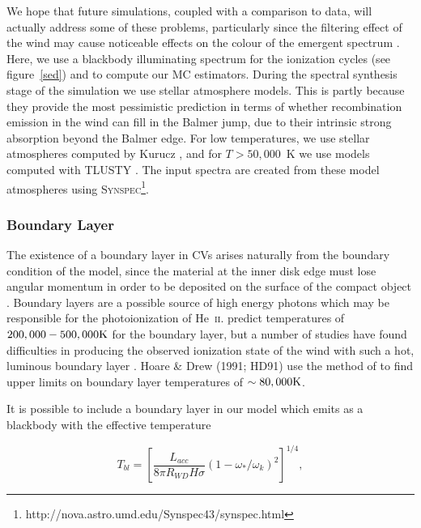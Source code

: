 \documentclass[preprint, a4paper, 11pt]{aastex}
\begin{document}
We hope that future simulations, coupled with a comparison to data, will 
actually address some of these problems, particularly since
the filtering effect of the wind may cause noticeable effects
on the colour of the emergent spectrum \citep{hassall}. 
Here, we use a blackbody illuminating spectrum
for the ionization cycles (see figure~\ref{sed}) and to compute our MC estimators.
During the spectral synthesis stage of the simulation we use stellar atmosphere models.
This is partly because they provide the most pessimistic prediction in terms of whether recombination emission in the 
wind can fill in the Balmer jump, due to their intrinsic strong absorption beyond the Balmer edge.
For low temperatures, we use stellar atmospheres computed 
by Kurucz \citep{kurucz1991}, and for $T>50,000$~K we use models computed with 
\textsc{TLUSTY} \citep{tlusty}. The input spectra are created from these model
atmospheres using \textsc{Synspec}\footnote{http://nova.astro.umd.edu/Synspec43/synspec.html}.


\subsubsection{Boundary Layer}
The existence of a boundary layer in CVs arises naturally from the boundary condition
of the \cite{shakurasunyaev1973} model, since the material at the inner disk
edge must lose angular momentum in order to be deposited on
the surface of the compact object \cite[see e.g.][]{lyndenbell1974}.
Boundary layers are a possible source of
high energy photons which may be responsible for the photoionization of 
He~\textsc{ii}. 
\cite{pringlesavonije1979} predict temperatures of 
$200,000-500,000{\rm K}$ for the boundary layer,
but a number of studies have found difficulties
in producing the observed ionization state of the wind
with such a hot, luminous boundary layer 
\citep[see e.g.][]{maucheraymond1987, drewverbunt1985}.
Hoare \& Drew (1991; HD91) \nocite{hoare1991}
use the method of \cite{zanstra1929} to find upper limits on 
boundary layer temperatures of $\sim80,000{\rm K}$.


It is possible to include a boundary layer in our model which emits 
as a blackbody with the effective temperature

\begin{equation}
T_{bl} = \left[ \frac{L_{acc}}{8 \pi R_{WD} H \sigma} ( 1 - \omega_*/\omega_k)^2 \right]^{1/4},
\label{bl}
\end{equation}
\end{document}
